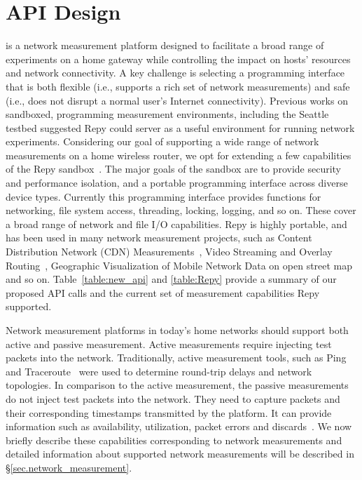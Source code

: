 \section{API Design}
{\raggedright
\sysname is a network measurement platform designed to facilitate a broad range of experiments on a home gateway while controlling the impact on hosts' resources and network connectivity. A key challenge is selecting a programming interface that is both flexible (i.e., supports a rich set of network measurements) and safe (i.e., does not disrupt a normal user's Internet connectivity). Previous works on sandboxed, programming measurement environments, including the Seattle testbed suggested Repy could server as a useful environment for running network experiments. Considering our goal of supporting a wide range of network measurements on a home wireless router, we opt for extending a few capabilities of the Repy sandbox~\cite{cappos2010retaining}. The major goals of the sandbox are to provide security and performance isolation, and a portable programming interface across diverse device types. Currently this programming interface provides functions for networking, file system access, threading, locking, logging, and so on. These cover a broad range of network and file I/O capabilities. Repy is highly portable, and has been used in many network measurement projects, such as Content Distribution Network (CDN) Measurements~\cite{rafetseder2011exploring}, Video Streaming and Overlay Routing~\cite{eisl2011service}, Geographic Visualization of Mobile Network Data on open street map~\cite{open3gmap} and so on. Table~\ref{table:new_api} and \ref{table:Repy} provide a summary of our proposed API calls and the current set of measurement capabilities Repy supported. 

Network measurement platforms in today's home networks should support both active and passive measurement. Active measurements require injecting test packets into the network. Traditionally, active measurement tools, such as Ping~\cite{ping} and Traceroute~\cite{traceroute} were used to determine round-trip delays and network topologies. In comparison to the active measurement, the passive measurements do not inject test packets into the network. They need to capture packets and their corresponding timestamps transmitted by the platform. It can provide information such as availability, utilization, packet errors and discards~\cite{calyamactive}. We now briefly describe these capabilities corresponding to network measurements and detailed information about supported network measurements will be described in \S{\ref{sec.network_measurement}}.

}
